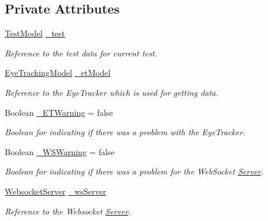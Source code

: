 \subsection*{Private Attributes}
\begin{DoxyCompactItemize}
\item 
\hyperlink{class_web_analyzer_1_1_models_1_1_data_model_1_1_test_model}{Test\+Model} \hyperlink{class_web_analyzer_1_1_controller_1_1_test_controller_a6084bcc401d37f7f8861fc0e9fb771b6}{\+\_\+test}
\begin{DoxyCompactList}\small\item\em Reference to the test data for current test. \end{DoxyCompactList}\item 
\hyperlink{class_web_analyzer_1_1_eye_tracking_1_1_eye_tracking_model}{Eye\+Tracking\+Model} \hyperlink{class_web_analyzer_1_1_controller_1_1_test_controller_a0db36e46096d444386af0d357905f430}{\+\_\+et\+Model}
\begin{DoxyCompactList}\small\item\em Reference to the Eye\+Tracker which is used for getting data. \end{DoxyCompactList}\item 
Boolean \hyperlink{class_web_analyzer_1_1_controller_1_1_test_controller_a33b43014ccf6b9f7cdd1e3136ac19d3a}{\+\_\+\+E\+T\+Warning} = false
\begin{DoxyCompactList}\small\item\em Boolean for indicating if there was a problem with the Eye\+Tracker. \end{DoxyCompactList}\item 
Boolean \hyperlink{class_web_analyzer_1_1_controller_1_1_test_controller_a517bab0ee0c22871788bd498de86c27e}{\+\_\+\+W\+S\+Warning} = false
\begin{DoxyCompactList}\small\item\em Boolean for indicating if there was a problem for the Web\+Socket \hyperlink{namespace_web_analyzer_1_1_server}{Server}. \end{DoxyCompactList}\item 
\hyperlink{class_web_analyzer_1_1_server_1_1_websocket_server}{Websocket\+Server} \hyperlink{class_web_analyzer_1_1_controller_1_1_test_controller_aeb605e9f2ad9c53af52fb846fe2a98a6}{\+\_\+ws\+Server}
\begin{DoxyCompactList}\small\item\em Reference to the Websocket \hyperlink{namespace_web_analyzer_1_1_server}{Server}. \end{DoxyCompactList}\item 

\end{DoxyCompactItemize}
